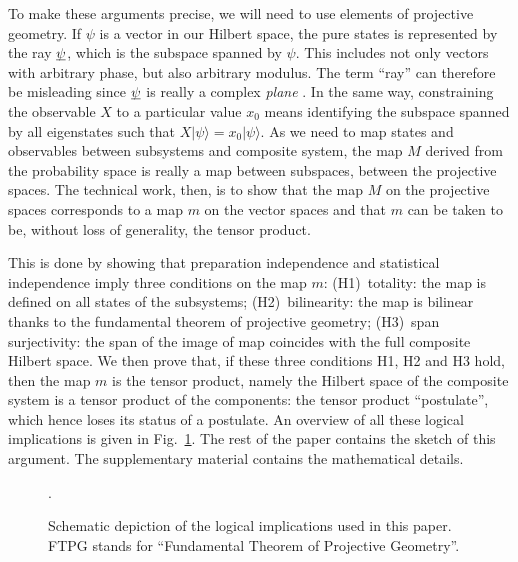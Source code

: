 \documentclass[aps,prl,amsmath,amssymb,twocolumn]{revtex4}
\theoremstyle{plain}
\theoremstyle{definition}
\theoremstyle{remark}
\newcommand{\pj}[1] {\underbar{$#1$}}
\def\>{\rangle}
\begin{document}
	To make these arguments precise, we will need to use elements of projective geometry.
	If $\psi$ is a vector in our Hilbert space, the pure states is represented by the ray $\pj{\psi}$, which is the subspace spanned by $\psi$. This includes not only vectors with arbitrary phase, but also arbitrary modulus. The term ``ray'' can therefore be misleading since $\pj{\psi}$ is really a complex { \em plane }. In the same way, constraining the observable $X$ to a particular value $x_0$ means identifying the subspace spanned by all eigenstates such that $X | \psi \> = x_0 |\psi\>$. As we need to map states and observables between subsystems and composite system, the map $M$ derived from the probability space is really a map between subspaces, between the projective spaces. The technical work, then, is to show that the map $M$ on the projective spaces corresponds to a map $m$ on the vector spaces and that $m$ can be taken to be, without loss of generality, the tensor product.

	This is done by showing that preparation independence and
	statistical independence imply three conditions on the map $m$:
	(H1)~totality: the map is defined on all states of the subsystems;
	(H2)~bilinearity: the map is bilinear thanks to the fundamental
	theorem of projective geometry; (H3)~span surjectivity: the span of
	the image of map coincides with the full composite Hilbert space.  We
	then prove that, if these three conditions H1, H2 and H3 hold, then
	the map $m$ is the tensor product, namely the Hilbert space of the
	composite system is a tensor product of the components: the tensor
	product ``postulate'', which hence loses its status of a postulate. An
	overview of all these logical implications is given in
	Fig.~\ref{f:fig}. The rest of the paper contains the sketch of this
	argument. The supplementary material contains the mathematical details.
	
	\begin{figure}[ht]
		.\hsize\leavevmode{}
		\caption{Schematic depiction of the logical implications used
			in this paper. FTPG stands for ``Fundamental Theorem of Projective Geometry''.  \label{f:fig}}\end{figure}
	
\end{document}
